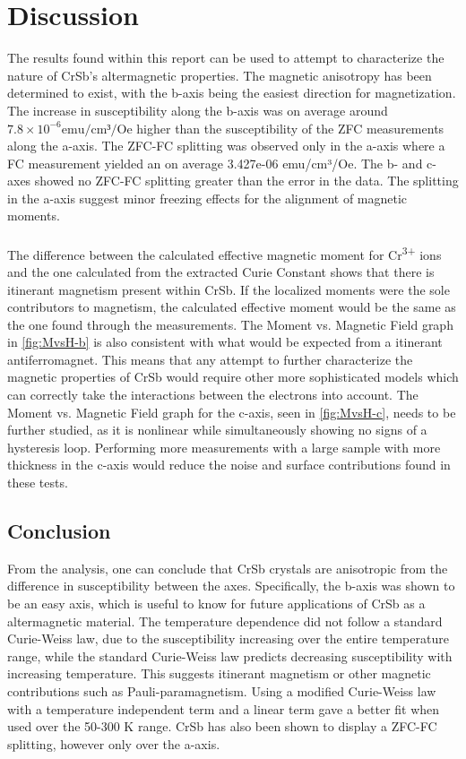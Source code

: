 
\section{Discussion}
    The results found within this report can be used to attempt to characterize the nature of CrSb's altermagnetic properties. 
    The magnetic anisotropy has been determined to exist, with the b-axis being the easiest direction for magnetization. 
    The increase in susceptibility along the b-axis was on average around $7.8\times10^{-6} \textrm{emu/cm³/Oe}$ higher than the susceptibility 
    of the ZFC measurements along the a-axis. The ZFC-FC splitting was observed only in the a-axis where a FC measurement yielded an on average 
    3.427e-06 emu/cm³/Oe. The b- and c-axes showed no ZFC-FC splitting greater than the error in the data. The splitting in the a-axis suggest 
    minor freezing effects for the alignment of magnetic moments.
    \\ \\
    The difference between the calculated effective magnetic moment for Cr\textsuperscript{3+} ions and the one calculated from the extracted 
    Curie Constant shows that there is itinerant magnetism present within CrSb. If the localized moments were the sole contributors to magnetism, 
    the calculated effective moment would be the same as the one found through the measurements. The Moment vs. Magnetic Field graph in 
    \autoref{fig:MvsH-b} is also consistent with what would be expected from a itinerant antiferromagnet. This means that any attempt to 
    further characterize the magnetic properties of CrSb would require other more sophisticated models which can correctly take the interactions 
    between the electrons into account. The Moment vs. Magnetic Field graph for the c-axis, seen in \autoref{fig:MvsH-c}, needs to be further studied, 
    as it is nonlinear while simultaneously showing no signs of a hysteresis loop. Performing more measurements with a large sample with more thickness 
    in the c-axis would reduce the noise and surface contributions found in these tests.
\subsection{Conclusion}
    From the analysis, one can conclude that CrSb crystals are anisotropic from the difference in susceptibility between the axes. Specifically, 
    the b-axis was shown to be an easy axis, which is useful to know for future applications of CrSb as a altermagnetic material. The temperature 
    dependence did not follow a standard Curie-Weiss law, due to the susceptibility increasing over the entire temperature range, while the standard 
    Curie-Weiss law predicts decreasing susceptibility with increasing temperature. This suggests itinerant magnetism or other magnetic contributions such as Pauli-paramagnetism. Using a modified Curie-Weiss law with a temperature independent term and a linear term gave a better fit when used over the 50-300 K range. CrSb has also been shown to display a ZFC-FC splitting, however only over the a-axis.
